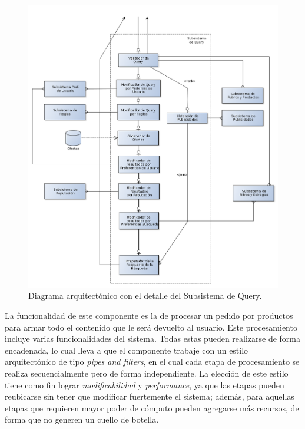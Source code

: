 \begin{figure}[H]
	\centering
	\includegraphics[width=\textwidth]{graficos/arch/subsistema_query.png}
	\caption{Diagrama arquitectónico con el detalle del \textsf{Subsistema de Query}.}
\end{figure}

La funcionalidad de este componente es la de procesar un pedido por productos para armar todo el contenido que le será devuelto al usuario. Este procesamiento incluye varias funcionalidades del sistema. Todas estas pueden realizarse de forma encadenada, lo cual lleva a que el componente trabaje con un estilo arquitectónico de tipo \emph{pipes and filters}, en el cual cada etapa de procesamiento se realiza secuencialmente pero de forma independiente. La elección de este estilo tiene como fin lograr \emph{modificabilidad} y \emph{performance}, ya que las etapas pueden reubicarse sin tener que modificar fuertemente el sistema; además, para aquellas etapas que requieren mayor poder de cómputo pueden agregarse más recursos, de forma que no generen un cuello de botella.

